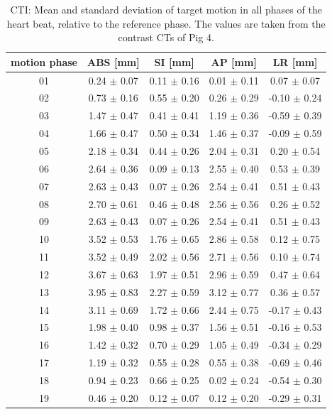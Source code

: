 \documentclass[type=dr, dr=rernat, accentcolor=tud7b,colorbacktitle, bigchapter, openright, twoside, 12pt ]{tudthesis}
\begin{document}
\begin{table}[htbp]
  \centering
  \tiny
  \caption{CTI: Mean and standard deviation of target motion in all phases of the heart beat, relative to the reference phase. The values are 
  taken from the contrast CTs of Pig 4.}
  \begin{tabular}{|c|c|c|c|c|}
    \hline\hline
    motion phase\rule{0pt}{2.6ex}\rule[-1.2ex]{0pt}{0pt} & ABS [mm] & SI [mm] & AP [mm] & LR [mm]\\
    \hline
01 &0.24 $\pm$ 0.07 &0.11 $\pm$ 0.16 &0.01 $\pm$ 0.11 &0.07 $\pm$ 0.07 \\
02 &0.73 $\pm$ 0.16 &0.55 $\pm$ 0.20 &0.26 $\pm$ 0.29 &-0.10 $\pm$ 0.24 \\
03 &1.47 $\pm$ 0.47 &0.41 $\pm$ 0.41 &1.19 $\pm$ 0.36 &-0.59 $\pm$ 0.39 \\
04 &1.66 $\pm$ 0.47 &0.50 $\pm$ 0.34 &1.46 $\pm$ 0.37 &-0.09 $\pm$ 0.59 \\
05 &2.18 $\pm$ 0.34 &0.44 $\pm$ 0.26 &2.04 $\pm$ 0.31 &0.20 $\pm$ 0.54 \\
06 &2.64 $\pm$ 0.36 &0.09 $\pm$ 0.13 &2.55 $\pm$ 0.40 &0.53 $\pm$ 0.39 \\
07 &2.63 $\pm$ 0.43 &0.07 $\pm$ 0.26 &2.54 $\pm$ 0.41 &0.51 $\pm$ 0.43 \\
08 &2.70 $\pm$ 0.61 &0.46 $\pm$ 0.48 &2.56 $\pm$ 0.56 &0.26 $\pm$ 0.52 \\
09 &2.63 $\pm$ 0.43 &0.07 $\pm$ 0.26 &2.54 $\pm$ 0.41 &0.51 $\pm$ 0.43 \\
10 &3.52 $\pm$ 0.53 &1.76 $\pm$ 0.65 &2.86 $\pm$ 0.58 &0.12 $\pm$ 0.75 \\
11 &3.52 $\pm$ 0.49 &2.02 $\pm$ 0.56 &2.71 $\pm$ 0.56 &0.10 $\pm$ 0.74 \\
12 &3.67 $\pm$ 0.63 &1.97 $\pm$ 0.51 &2.96 $\pm$ 0.59 &0.47 $\pm$ 0.64 \\
13 &3.95 $\pm$ 0.83 &2.27 $\pm$ 0.59 &3.12 $\pm$ 0.77 &0.36 $\pm$ 0.57 \\
14 &3.11 $\pm$ 0.69 &1.72 $\pm$ 0.66 &2.44 $\pm$ 0.75 &-0.17 $\pm$ 0.43 \\
15 &1.98 $\pm$ 0.40 &0.98 $\pm$ 0.37 &1.56 $\pm$ 0.51 &-0.16 $\pm$ 0.53 \\
16 &1.42 $\pm$ 0.32 &0.70 $\pm$ 0.29 &1.05 $\pm$ 0.49 &-0.34 $\pm$ 0.29 \\
17 &1.19 $\pm$ 0.32 &0.55 $\pm$ 0.28 &0.55 $\pm$ 0.38 &-0.69 $\pm$ 0.46 \\
18 &0.94 $\pm$ 0.23 &0.66 $\pm$ 0.25 &0.02 $\pm$ 0.24 &-0.54 $\pm$ 0.30 \\
19 &0.46 $\pm$ 0.20 &0.12 $\pm$ 0.07 &0.12 $\pm$ 0.20 &-0.29 $\pm$ 0.31 \\
    \hline\hline
  \end{tabular}
  \label{tab:motion:CTI:Pig4}
\end{table}
\end{document}
